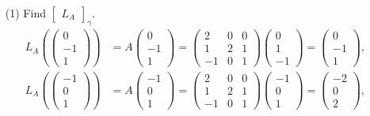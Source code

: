 \documentclass[12pt]{article}
\begin{document}
\begin{itemize}
    \item[(1)] Find $\begin{bmatrix}
    L_A
    \end{bmatrix}_\gamma$. \begin{align*}
        L_A \left( \begin{pmatrix}
        0 \\ -1 \\ 1
        \end{pmatrix} \right) &= A \begin{pmatrix}
        0 \\ -1 \\ 1
        \end{pmatrix} = \begin{pmatrix}
        2 & 0 & 0 \\ 1 & 2 & 1 \\ -1 & 0 & 1
        \end{pmatrix} \begin{pmatrix}
        0 \\ 1 \\ -1
        \end{pmatrix} = \begin{pmatrix}
        0 \\ -1 \\ 1
        \end{pmatrix}, \\
        L_A \left( \begin{pmatrix}
        -1 \\ 0 \\ 1
        \end{pmatrix} \right) &= A \begin{pmatrix}
        -1 \\ 0 \\ 1
        \end{pmatrix} = \begin{pmatrix}
        2 & 0 & 0 \\ 1 & 2 & 1 \\ -1 & 0 & 1
        \end{pmatrix} \begin{pmatrix}
        -1 \\ 0 \\ 1
        \end{pmatrix} = \begin{pmatrix}
        -2 \\ 0 \\ 2
        \end{pmatrix}, \\

\end{align*}
\end{itemize}
\end{document}
